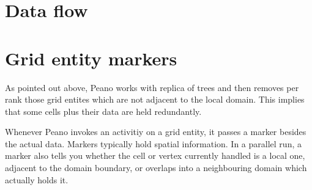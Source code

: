 \section{Data flow}


\section{Grid entity markers}

As pointed out above, Peano works with replica of trees and then removes per
rank those grid entites which are not adjacent to the local domain.
This implies that some cells plus their data are held redundantly.

Whenever Peano invokes an activitiy on a grid entity, it passes a marker besides
the actual data.
Markers typically hold spatial information.
In a parallel run, a marker also tells you whether the cell or vertex currently
handled is a local one, adjacent to the domain boundary, or overlaps into a
neighbouring domain which actually holds it.
